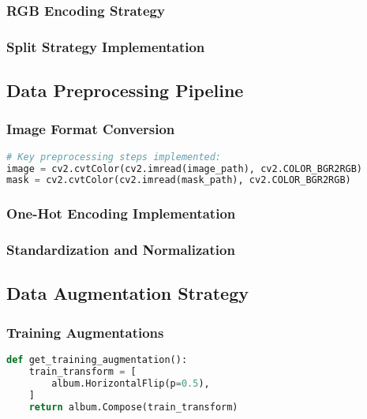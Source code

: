 \documentclass[12pt,a4paper]{report}
\begin{document}
\subsubsection{RGB Encoding Strategy}

\subsubsection{Split Strategy Implementation}

\subsection{Data Preprocessing Pipeline}

\subsubsection{Image Format Conversion}

\begin{lstlisting}[language=Python, caption=BGR to RGB Conversion]
# Key preprocessing steps implemented:
image = cv2.cvtColor(cv2.imread(image_path), cv2.COLOR_BGR2RGB)
mask = cv2.cvtColor(cv2.imread(mask_path), cv2.COLOR_BGR2RGB)
\end{lstlisting}

\subsubsection{One-Hot Encoding Implementation}

\subsubsection{Standardization and Normalization}

\subsection{Data Augmentation Strategy}

\subsubsection{Training Augmentations}

\begin{lstlisting}[language=Python, caption=Training Augmentation Pipeline]
def get_training_augmentation():
    train_transform = [
        album.HorizontalFlip(p=0.5),
    ]
    return album.Compose(train_transform)
\end{lstlisting}
\end{document}
